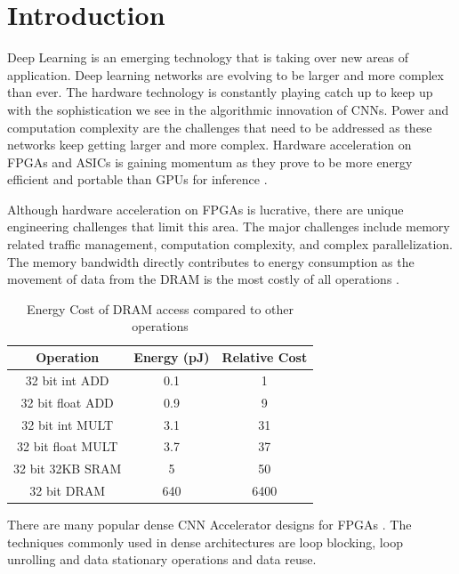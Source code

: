 \documentclass[conference]{IEEEtran}
\begin{document}
\section{Introduction}
Deep Learning is an emerging technology that is taking over new areas of application. Deep learning networks are evolving to be larger and more complex than ever\cite{he2016deep, szegedy2015going}. The hardware technology is constantly playing catch up to keep up with the sophistication we see in the algorithmic innovation of CNNs. Power and computation complexity are the challenges that need to be addressed as these networks keep getting larger and more complex. 
Hardware acceleration on FPGAs\cite{Lacey2016} and ASICs is gaining momentum as they prove to be more energy efficient and portable than GPUs for inference\cite{Fowers:2012:PEC:2145694.2145704} \cite{sze2017efficient}.  

Although hardware acceleration on FPGAs is lucrative, there are unique engineering challenges that limit this area. The major challenges include memory related traffic management, computation complexity, and complex parallelization. The memory bandwidth directly contributes to energy consumption as the movement of data from the DRAM is the most costly of all operations \cite{han2016eie}.

\begin{table}[!ht]
\centering
\caption{Energy Cost of DRAM access compared to other operations\cite{han2016eie}}
\label{energy}
\begin{tabular}{ccc}
\hline
\textbf{Operation} & \textbf{Energy (pJ)} & \textbf{Relative Cost} \\ \hline
32 bit int ADD     & 0.1                  & 1                      \\
32 bit float ADD   & 0.9                  & 9                      \\
32 bit int MULT    & 3.1                  & 31                     \\
32 bit float MULT  & 3.7                  & 37                     \\
32 bit 32KB SRAM   & 5                    & 50                     \\
32 bit DRAM        & 640                  & 6400                   \\ \hline
\end{tabular}
\end{table}


There are many popular dense CNN Accelerator designs for FPGAs \cite{chakradhar2010dynamically,zhang2015optimizing,Eyeriss}.
The techniques commonly used in dense architectures are loop blocking, loop unrolling and data stationary operations and data reuse. 
\end{document}
